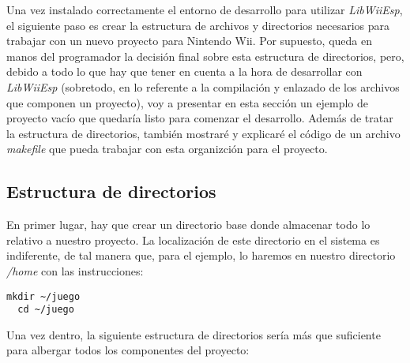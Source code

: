 
Una vez instalado correctamente el entorno de desarrollo para utilizar \emph{LibWiiEsp}, el siguiente paso es crear la estructura de archivos y directorios necesarios para trabajar con un nuevo proyecto para Nintendo Wii. Por supuesto, queda en manos del programador la decisión final sobre esta estructura de directorios, pero, debido a todo lo que hay que tener en cuenta a la hora de desarrollar con \emph{LibWiiEsp} (sobretodo, en lo referente a la compilación y enlazado de los archivos que componen un proyecto), voy a presentar en esta sección un ejemplo de proyecto vacío que quedaría listo para comenzar el desarrollo. Además de tratar la estructura de directorios, también mostraré y explicaré el código de un archivo \emph{makefile} que pueda trabajar con esta organizción para el proyecto.

\subsection{Estructura de directorios}

En primer lugar, hay que crear un directorio base donde almacenar todo lo relativo a nuestro proyecto. La localización de este directorio en el sistema es indiferente, de tal manera que, para el ejemplo, lo haremos en nuestro directorio \emph{/home} con las instrucciones:

\begin{lstlisting}[style=consola]
  mkdir ~/juego
  cd ~/juego
\end{lstlisting}

Una vez dentro, la siguiente estructura de directorios sería más que suficiente para albergar todos los componentes del proyecto:


